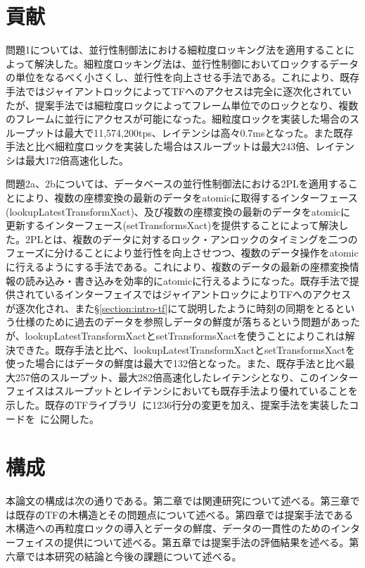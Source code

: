 \documentclass[a4paper]{jreport}	%
\begin{document}
\section{貢献}
問題1については、並行性制御法における細粒度ロッキング法を適用することによって解決した。細粒度ロッキング法は、並行性制御においてロックするデータの単位をなるべく小さくし、並行性を向上させる手法である。これにより、既存手法ではジャイアントロックによってTFへのアクセスは完全に逐次化されていたが、提案手法では細粒度ロックによってフレーム単位でのロックとなり、複数のフレームに並行にアクセスが可能になった。細粒度ロックを実装した場合のスループットは最大で11,574,200tps、レイテンシは高々0.7msとなった。また既存手法と比べ細粒度ロックを実装した場合はスループットは最大243倍、レイテンシは最大172倍高速化した。

問題2a、2bについては、データベースの並行性制御法における2PLを適用することにより、複数の座標変換の最新のデータをatomicに取得するインターフェース(lookupLatestTransformXact)、及び複数の座標変換の最新のデータをatomicに更新するインターフェース(setTransformsXact)を提供することによって解決した。2PLとは、複数のデータに対するロック・アンロックのタイミングを二つのフェーズに分けることにより並行性を向上させつつ、複数のデータ操作をatomicに行えるようにする手法である。これにより、複数のデータの最新の座標変換情報の読み込み・書き込みを効率的にatomicに行えるようになった。既存手法で提供されているインターフェイスではジャイアントロックによりTFへのアクセスが逐次化され、また§\ref{section:intro-tf}にて説明したように時刻の同期をとるという仕様のために過去のデータを参照しデータの鮮度が落ちるという問題があったが、lookupLatestTransformXactとsetTransformsXactを使うことによりこれは解決できた。既存手法と比べ、lookupLatestTransformXactとsetTransformsXactを使った場合にはデータの鮮度は最大で132倍となった。また、既存手法と比べ最大257倍のスループット、最大282倍高速化したレイテンシとなり、このインターフェイスはスループットとレイテンシにおいても既存手法より優れていることを示した。既存のTFライブラリ~\cite{ros-geometry2}に1236行分の変更を加え、提案手法を実装したコードを~\cite{ogiwara-geometry2}に公開した。

\section{構成}
本論文の構成は次の通りである。第二章では関連研究について述べる。第三章では既存のTFの木構造とその問題点について述べる。第四章では提案手法である木構造への再粒度ロックの導入とデータの鮮度、データの一貫性のためのインターフェイスの提供について述べる。第五章では提案手法の評価結果を述べる。第六章では本研究の結論と今後の課題について述べる。
\end{document}

